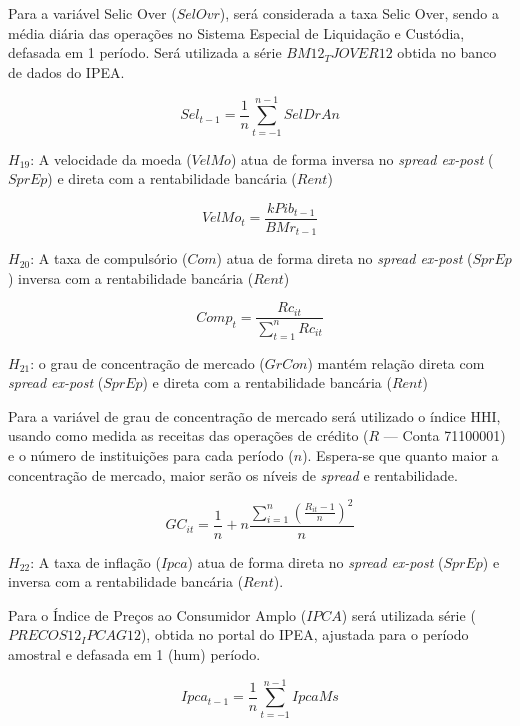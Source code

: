 \documentclass[
  12pt,
  12pt,
  openright,
  oneside,
  a4paper,
  chapter=TITLE,
  section=TITLE,
  subsection=TITLE,
  subsubsection=TITLE,
  english,
  portugues,
  sumario=tradicional]{abntex2}
\begin{document}
Para a variável Selic Over (\(SelOvr\)), será considerada a taxa Selic Over, sendo a média diária das operações no Sistema Especial de Liquidação e Custódia, defasada em 1 período. Será utilizada a série \(BM12_TJOVER12\) obtida no banco de dados do IPEA.

\begin{equation}
Sel_{t-1} = \frac{1}{n}\sum_{t=-1}^{n-1}SelDrAn
\end{equation}

\(H_{19}\): A velocidade da moeda (\(VelMo\)) atua de forma inversa no \emph{spread ex-post} (\(SprEp\)) e direta com a rentabilidade bancária (\(Rent\))

\begin{equation}
VelMo_{t} = \frac{k Pib_{t-1}}{BMr_{t-1}}
\end{equation}

\(H_{20}\): A taxa de compulsório (\(Com\)) atua de forma direta no \emph{spread ex-post} (\(SprEp\)) inversa com a rentabilidade bancária (\(Rent\))

\begin{equation}
Comp_{t} = \frac{Rc_{it}}{\sum_{t=1}^{n}Rc_{it}}
\end{equation}

\(H_{21}\): o grau de concentração de mercado (\(GrCon\)) mantém relação direta com \emph{spread ex-post} (\(SprEp\)) e direta com a rentabilidade bancária (\(Rent\))

Para a variável de grau de concentração de mercado será utilizado o índice HHI, usando como medida as receitas das operações de crédito (\(R\) --- Conta 71100001) e o número de instituições para cada período (\(n\)). Espera-se que quanto maior a concentração de mercado, maior serão os níveis de \emph{spread} e rentabilidade.

\begin{equation}
GC_{it} = \frac{1}{n} + n\frac{\sum_{i=1}^{n}(\frac{R_{it} - 1}{n})^2}{n}
\end{equation}

\(H_{22}\): A taxa de inflação (\(Ipca\)) atua de forma direta no \emph{spread ex-post} (\(SprEp\)) e inversa com a rentabilidade bancária (\(Rent\)).

Para o Índice de Preços ao Consumidor Amplo (\(IPCA\)) será utilizada série (\(PRECOS12_IPCAG12\)), obtida no portal do IPEA, ajustada para o período amostral e defasada em 1 (hum) período.

\begin{equation}
Ipca_{t-1} = \frac{1}{n}\sum_{t=-1}^{n-1}IpcaMs
\end{equation}
\end{document}
